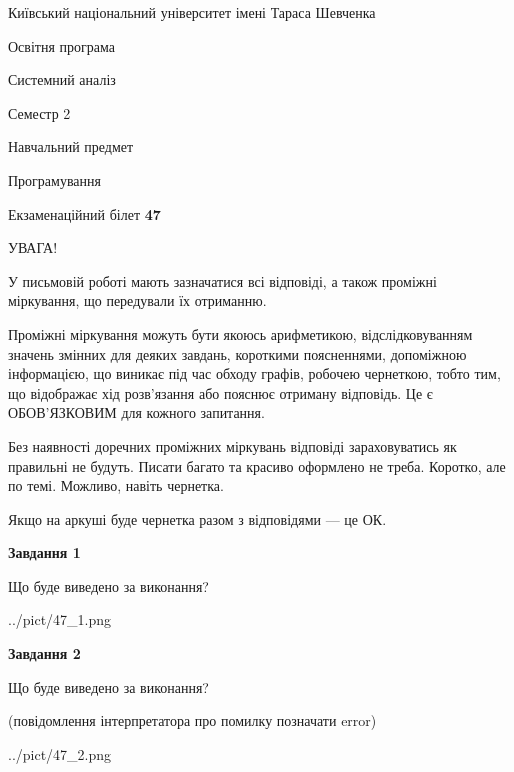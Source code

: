 \documentclass[12pt, ukrainian]{article}
\begin{document}
{{\begin {small}\par
{ \center  Київський національний університет імені Тараса Шевченка \par}
{\parbox {5 cm}{Освітня програма \hfill}{\parbox {7 cm}{Системний аналіз \hfill}}\parbox {6 cm}{\hfill Семестр 2}}\par
{\parbox {5 cm} {Навчальний предмет \hfill}\parbox {7 cm}{Програмування \hfill}\parbox {6cm}{\hfill}\par}\vspace{-7pt} \end{small}}{\center Екзаменаційний білет \No \textbf
{ 47 }\par}}
{
\begin {large}
УВАГА!

У письмовій роботі мають зазначатися всі відповіді, а також проміжні міркування, що передували їх отриманню.

Проміжні міркування можуть бути якоюсь арифметикою, відслідковуванням зна\-чень змінних для деяких завдань,
короткими поясненнями, допоміжною інформацією, що виникає під час обходу графів, робочею чернеткою,
тобто тим, що відображає хід розв’язання або пояснює отриману відповідь.
Це є ОБОВ’ЯЗКОВИМ для кожного запитання.

Без наявності доречних проміжних міркувань відповіді зараховуватись як правиль\-ні не будуть.
Писати багато та красиво оформлено не треба. Коротко, але по темі. Можли\-во, навіть чернетка.

Якщо на аркуші буде чернетка разом з відповідями --- це ОК.

\newpage

{\begin {center}\textbf{Завдання 1}\end {center}}\par
Що буде виведено за виконання?\par
\begin{center}
	{../pict/47_1.png}
\end{center}
\newpage

{\begin {center}\textbf{Завдання 2}\end {center}}\par
Що буде виведено за виконання?\par
 (повідомлення інтерпретатора про помилку позначати error)\par
\begin{center}
	{../pict/47_2.png}
\end{center}
\newpage


\end{large}}
\end{document}
